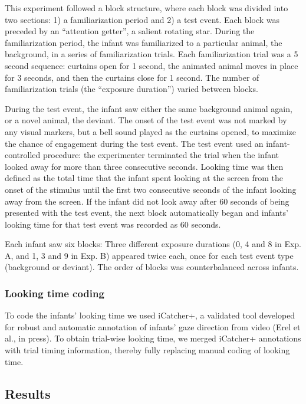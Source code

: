 \documentclass[10pt, letterpaper]{article}
\begin{document}
This experiment followed a block structure, where each block was divided
into two sections: 1) a familiarization period and 2) a test event. Each
block was preceded by an ``attention getter'', a salient rotating star.
During the familiarization period, the infant was familiarized to a
particular animal, the background, in a series of familiarization
trials. Each familiarization trial was a 5 second sequence: curtains
open for 1 second, the animated animal moves in place for 3 seconds, and
then the curtains close for 1 second. The number of familiarization
trials (the ``exposure duration'') varied between blocks.

During the test event, the infant saw either the same background animal
again, or a novel animal, the deviant. The onset of the test event was
not marked by any visual markers, but a bell sound played as the
curtains opened, to maximize the chance of engagement during the test
event. The test event used an infant-controlled procedure: the
experimenter terminated the trial when the infant looked away for more
than three consecutive seconds. Looking time was then defined as the
total time that the infant spent looking at the screen from the onset of
the stimulus until the first two consecutive seconds of the infant
looking away from the screen. If the infant did not look away after 60
seconds of being presented with the test event, the next block
automatically began and infants' looking time for that test event was
recorded as 60 seconds.

Each infant saw six blocks: Three different exposure durations (0, 4 and
8 in Exp. A, and 1, 3 and 9 in Exp. B) appeared twice each, once for
each test event type (background or deviant). The order of blocks was
counterbalanced across infants.

\hypertarget{looking-time-coding}{%
\subsubsection{Looking time coding}\label{looking-time-coding}}

To code the infants' looking time we used iCatcher+, a validated tool
developed for robust and automatic annotation of infants' gaze direction
from video (Erel et al., in press). To obtain trial-wise looking time,
we merged iCatcher+ annotations with trial timing information, thereby
fully replacing manual coding of looking time.

\hypertarget{results-1}{%
\subsection{Results}\label{results-1}}
\end{document}
